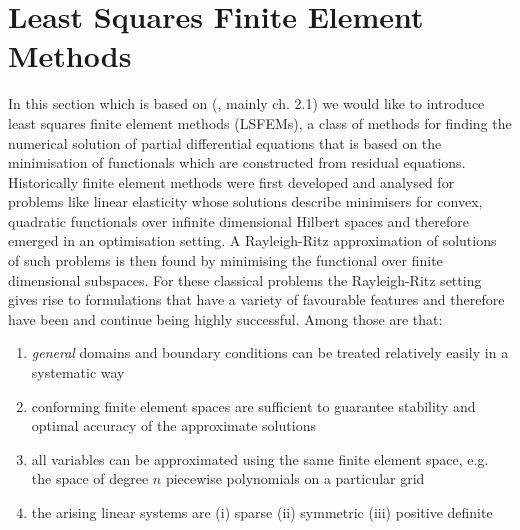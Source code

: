 \documentclass[../draft_1.tex]{subfiles}
\begin{document}
\section{Least Squares Finite Element Methods}

In this section which is based on (\cite{bochev2009least}, mainly ch. 2.1) we would like to introduce least squares finite element methods (LSFEMs), a class of methods for finding the numerical solution of partial differential equations that is based on the minimisation of functionals which are constructed from residual equations. Historically finite element methods were first developed and analysed for problems like linear elasticity whose solutions describe minimisers for convex, quadratic functionals over infinite dimensional Hilbert spaces and therefore emerged in an optimisation setting. A Rayleigh-Ritz approximation of solutions of such problems is then found by minimising the functional over finite dimensional subspaces. For these classical problems the Rayleigh-Ritz setting gives rise to formulations that have a variety of favourable features and therefore have been and continue being highly successful.  Among those are that:

\begin{enumerate}
	\item \textit{general} domains and boundary conditions can be treated relatively easily in a systematic way 
	\item conforming finite element spaces are sufficient to guarantee stability and optimal accuracy of the approximate solutions
	\item all variables can be approximated using the same finite element space, e.g. the space of degree $n$ piecewise polynomials on a particular grid
	\item the arising linear systems are 
	\subitem (i) sparse
	\subitem (ii) symmetric
	\subitem (iii) positive definite
\end{enumerate}
\end{document}
